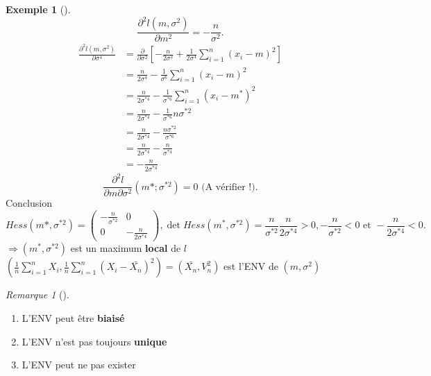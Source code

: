 \documentclass{article}
\theoremstyle{plain}%
\theoremstyle{definition}
\newtheorem{exmp}{Exemple}[section]
\theoremstyle{remark}
\newtheorem*{rem}{Remarque}
\begin{document}
\begin{exmp}[]
    \[
        \frac{\partial ^2 l(m, \sigma ^2)}{\partial m^2} = - \frac{n}{\sigma ^2}
    .\]
    \begin{align*}
        \frac{\partial ^2 l(m, \sigma ^2)}{\partial \sigma ^4} &= \frac{\partial }{\partial \sigma ^2} [-\frac{n}{2 \sigma ^2} + \frac{1}{2 \sigma ^4} \sum_{i=1}^{n}(x_i - m)^2] \\
        &= \frac{n}{2 \sigma ^4} - \frac{1}{\sigma ^6}\sum_{i=1}^{n}(x_i-m) ^2 \\
        &= \frac{n}{2 \sigma ^{*4}} - \frac{1}{\sigma ^{*6}}\sum_{i=1}^{n}(x_i - m^*)^2 \\
        &= \frac{n}{2 \sigma ^{*4}} - \frac{1}{\sigma ^{*6}} n \sigma ^{*2} \\
        &= \frac{n}{2 \sigma ^{*4}}- \frac{n \sigma ^{*2}}{\sigma ^{*6}} \\
        &= \frac{n}{2 \sigma ^{*4}} - \frac{n}{\sigma ^{*4}} \\ 
        &= -\frac{n}{2 \sigma ^{*4}}
    \end{align*}
    \[
        \frac{\partial ^2 l}{\partial m \partial \sigma ^2}(m*; \sigma ^{*2}) = 0 \text{ (A vérifier !)}
    .\]
    Conclusion 
    \[
        Hess (m*, \sigma ^{*2}) = \begin{pmatrix}
            -\frac{n}{\sigma ^{*2}} & 0 \\
            0 & -\frac{n}{2 \sigma ^{*4}}
        \end{pmatrix}, \det Hess(m^*, \sigma ^{*2}) = \frac{n}{\sigma ^{*2}}\frac{n}{2 \sigma ^{*4}} > 0 , -\frac{n}{\sigma ^{*2}} < 0 \text{ et } -\frac{n}{2 \sigma ^{*4}} < 0
    .\]
    $ \Rightarrow (m^*, \sigma ^{*2})$ est un maximum \textbf{local} de $ l $ \\
    $ (\frac{1}{n}\sum_{i=1}^{n}X_i, \frac{1}{n}\sum_{i=1}^{n}(X_i - \bar{X_n})^2) = (\bar{X_n}, V_n^2) $ est l'ENV de $ (m, \sigma ^2) $ 
\end{exmp}

\begin{rem}[]
    \begin{enumerate}
        \item L'ENV peut être \textbf{biaisé}
        \item L'ENV n'est pas toujours \textbf{unique}
        \item L'ENV peut ne pas exister
    \end{enumerate}
\end{rem}
\end{document}
